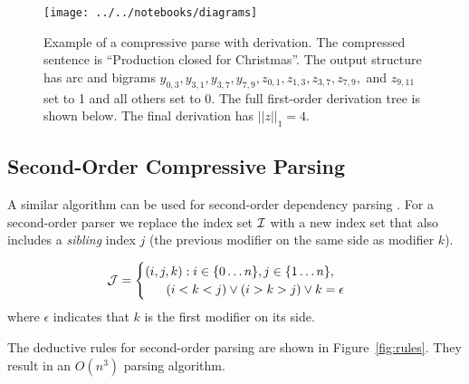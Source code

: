 \documentclass[11pt]{article}
\newcommand{\NULL}{\ensuremath{\epsilon}}
\newcommand{\Enum}[1]{\{1 \ldots #1\}}
\newcommand{\EnumS}[2]{\{#1 \ldots #2\}}
\newcommand{\IndexSet}{{\cal I}}
\newcommand{\IndexSetB}{{\cal J}}
\newcommand{\rtrap}{\scalebox{0.2}{\tikz{
    \coordinate (A) at (0,0);
    \coordinate (B) at (90:1.5cm);
    \coordinate (C) at (2.5,0.9cm);
    \coordinate (D) at (0:2.5cm);
    \draw[line width = 0.05cm] (A)--(B)--(C)--(D)--cycle;
    }}}
\newcommand{\ltrap}{\scalebox{0.2}{\tikz{
    \coordinate (A) at (0,0);
    \coordinate (B) at (90:1.5cm);
    \coordinate (C) at (-2.5,0.9cm);
    \coordinate (D) at (180:2.5cm);
    \draw[line width = 0.05cm] (A)--(B)--(C)--(D)--cycle;
    }}}
\newcommand{\rtriskip}{\scalebox{0.2}{\tikz{
      \begin{scope}[decoration={
          markings,
          mark=at position 0.7 with {\arrow[scale=2.75]{|}}
        }]
    \coordinate (A) at (0,0);
    \coordinate (B) at (90:1.5cm);
    \coordinate (C) at (180:-1.7cm);
        \draw[postaction={decorate}, line width = 0.05cm] (B) -- (C);
        \draw[line width = 0.05cm] (A)--(B)--(C)--cycle;
      \end{scope}
    }}}
\newcommand{\rtri}{\scalebox{0.2}{\tikz{
    \coordinate (A) at (0,0);
    \coordinate (B) at (90:1.5cm);
    \coordinate (C) at (180:-1.7cm);
    \draw[line width = 0.05cm] (A)--(B)--(C)--cycle;
    }}}
\newcommand{\ltri}{\scalebox{0.2}{\tikz{
    \coordinate (A) at (0,0);
    \coordinate (B) at (90:1.5cm);
    \coordinate (C) at (180:1.7cm);
    \draw[line width = 0.05cm] (A)--(B)--(C)--cycle;
    }}}
\begin{document}






\begin{figure*}
  \centering
  \texttt{[image: ../../notebooks/diagrams]}
  \label{fig:parse}
  \caption{Example of a compressive parse with derivation. The compressed sentence is ``Production closed for Christmas''. The output structure has arc and bigrams $y_{0,3}, y_{3,1},y_{3,7},y_{7,9},z_{0,1},z_{1,3},z_{3,7}, z_{7,9},$ and $z_{9,11}$ set to 1 and all others set to 0. The full first-order derivation tree is shown below. The final derivation has $||z||_1=4$. }
\end{figure*}


\subsection{Second-Order Compressive Parsing}

A similar algorithm can be used for second-order dependency parsing \cite{}. For a second-order parser
we replace the index set $\IndexSet$ with a new index set that also includes a \textit{sibling}
index $j$ (the previous modifier on the same side as modifier $k$). 

\[ \IndexSetB=  \begin{cases} (i,j,k) : 
    i \in \EnumS{0}{n}, j \in \Enum{n}, \\
    \ \ \ \ \  (i < k < j) \lor (i >k  > j) \lor k = \NULL
  \end{cases} \ \]
\noindent where $\NULL$ indicates that $k$ is the first modifier on its side. 

The deductive rules for second-order parsing are shown in
Figure~\ref{fig:rules}. They result in an $O(n^3)$ parsing algorithm.
\end{document}
